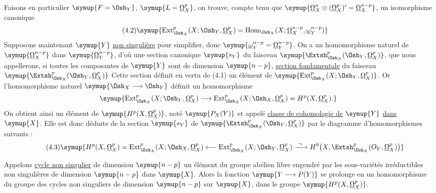 Faisons en particulier $\symup{F=\Osh_Y}$, $\symup{L=\underline{\Omega}_X^{p}}$, on trouve, compte tenu
que $\symup{\underline{\Omega}_X^{n}\otimes(\underline{\Omega}_X^{p})'=\underline{\Omega}_X^{n-p}}$, un isomorphisme
canonique
\begin{equation}\tag{4.2}
  \symup{\operatorname{Ext}_{\Osh_X}^{p}(X;\Osh_Y,\underline{\Omega}_X^{p})
  =\operatorname{Hom}_{\Osh_X}
  (X;\underline{\Omega}_X^{n-p},\underline{\omega}_Y^{n-p})}
\end{equation}
Supposons maintenant $\symup{Y}$ \uline{non singulière} pour simplifier, donc
$\symup{\underline{\omega}_Y^{n-p}=\underline{\Omega}_Y^{n-p}}$. On a un homomorphisme naturel de
$\symup{\underline{\Omega}_X^{n-p}}$ dans $\symup{\underline{\Omega}_Y^{n-p}}$, d'où une section canonique $\symup{s_Y}$ du
faisceau $\symup{\Extsh_{\Osh_X}^{p}(\Osh_Y,\underline{\Omega}_X^{p})}$, que nous appellerons, si
toutes les composantes de $\symup{Y}$ sont de dimension $\symup{n-p}$, \uline{section
fondamentale} du faisceau $\symup{\Extsh_{\Osh_X}^{p}(\Osh_Y,\underline{\Omega}_X^{p})}$ Cette
section définit en vertu de (4.1) un élément de
$\symup{\operatorname{Ext}_{\Osh_X}^{p}(X;\Osh_Y,\underline{\Omega}_X^{p})}$. Or l'homomorphisme
naturel $\symup{\Osh_X\longrightarrow\Osh_Y}$ définit un homomorphisme
\[
  \symup{\operatorname{Ext}_{\Osh_X}^{p}(X;\Osh_Y,\underline{\Omega}_X^{p})
  \longrightarrow
  \operatorname{Ext}_{\Osh_X}^{p}(X;\Osh_X,\underline{\Omega}_X^{p})
  =H^{p}(X,\underline{\Omega}_X^{p}).}
\]
On obtient ainsi un élément de $\symup{H^{p}(X,\underline{\Omega}_X^{p})}$, noté $\symup{P_X(Y)}$ et appelé
\uline{classe de cohomologie de} $\symup{Y}$ \uline{dans} $\symup{X}$. Elle est donc déduite de la section
$\symup{s_Y}$ de $\symup{\Extsh_{\Osh_X}^{p}(\Osh_Y,\underline{\Omega}_X^{p})}$ par le diagramme
d'homomorphismes suivants :
\begin{equation}\tag{4.3}
\symup{H^{p}(X,\underline{\Omega}_X^{p})
=\operatorname{Ext}_{\Osh_X}^{p}(X;\Osh_X,\underline{\Omega}_X^{p})
\longleftarrow\operatorname{Ext}_{\Osh_X}^{p}(X;\Osh_Y,\underline{\Omega}_X^{p})
\xrightarrow{\ \sim\ }
H^{0}\!\left(X,\Extsh_{\Osh_X}^{p}(O_Y,\underline{\Omega}_X^{p})\right)}
\end{equation}

Appelons \uline{cycle non singulier} de dimension $\symup{n-p}$ un élément du groupe
abélien libre engendré par les sous-variétés irréductibles non singulières de
dimension $\symup{n-p}$ dans $\symup{X}$. Alors la fonction $\symup{Y\longrightarrow P(Y)}$ se prolonge en
un homomorphisme du groupe des cycles non singuliers de dimension $\symup{n-p}$ sur $\symup{X}$,
dans le groupe $\symup{H^{p}(X,\underline{\Omega}_X^{p})}$.

